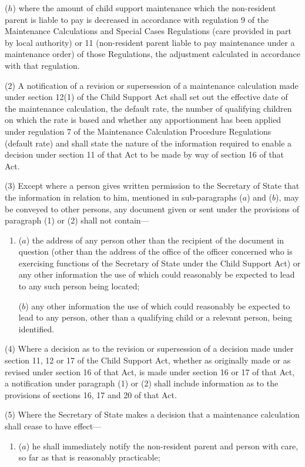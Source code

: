 \documentclass[12pt,a4paper]{article}
\begin{document}
{\begin{enumerate}
($h$) where the amount of child support maintenance which the non-resident parent is liable to pay is decreased in accordance with regulation 9 of the Maintenance Calculations and Special Cases Regulations (care provided in part by local authority) or 11 (non-resident parent liable to pay maintenance under a maintenance order) of those Regulations, the adjustment calculated in accordance with that regulation.
\end{enumerate}

(2) A notification of a revision or supersession of a maintenance calculation made under section 12(1) of the Child Support Act shall set out the effective date of the maintenance calculation, the default rate, the number of qualifying children on which the rate is based and whether any apportionment has been applied under regulation 7 of the Maintenance Calculation Procedure Regulations (default rate) and shall state the nature of the information required to enable a decision under section 11 of that Act to be made by way of section 16 of that Act.

(3) Except where a person gives written permission to the Secretary of State that the information in relation to him, mentioned in sub-paragraphs ($a$)  and ($b$), may be conveyed to other persons, any document given or sent under the provisions of paragraph (1) or (2) shall not contain—
\begin{enumerate}\item[]
($a$) the address of any person other than the recipient of the document in question (other than the address of the office of the officer concerned who is exercising functions of the Secretary of State under the Child Support Act) or any other information the use of which could reasonably be expected to lead to any such person being located;

($b$) any other information the use of which could reasonably be expected to lead to any person, other than a qualifying child or a relevant person, being identified.
\end{enumerate}

(4) Where a decision as to the revision or supersession of a decision made under section 11, 12 or 17 of the Child Support Act, whether as originally made or as revised under section 16 of that Act, is made under section 16 or 17 of that Act, a notification under paragraph (1) or (2) shall include information as to the provisions of sections 16, 17 and 20 of that Act.

(5) Where the Secretary of State makes a decision that a maintenance calculation shall cease to have effect—
\begin{enumerate}\item[]
($a$) he shall immediately notify the non-resident parent and person with care, so far as that is reasonably practicable;


\end{enumerate}}
\end{document}
